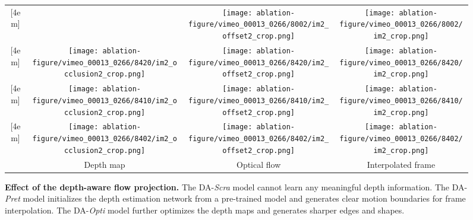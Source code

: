 \documentclass[10pt,twocolumn,letterpaper]{article}
\begin{document}
 	\begin{figure}
	\footnotesize
	\centering
	\renewcommand{\tabcolsep}{1pt} \renewcommand{\arraystretch}{0.7} \begin{tabular}{cccc}
			\parbox[t]{2mm}{[4em]{}} &
&
			\texttt{[image: ablation-figure/vimeo\_00013\_0266/8002/im2\_offset2\_crop.png]}&
			\texttt{[image: ablation-figure/vimeo\_00013\_0266/8002/im2\_crop.png]}
			\\
\parbox[t]{2mm}{[4em]{}} &
			\texttt{[image: ablation-figure/vimeo\_00013\_0266/8420/im2\_occlusion2\_crop.png]}&
			\texttt{[image: ablation-figure/vimeo\_00013\_0266/8420/im2\_offset2\_crop.png]}&
			\texttt{[image: ablation-figure/vimeo\_00013\_0266/8420/im2\_crop.png]}
			\\
			
			\parbox[t]{2mm}{[4em]{}} &
			\texttt{[image: ablation-figure/vimeo\_00013\_0266/8410/im2\_occlusion2\_crop.png]}&
			\texttt{[image: ablation-figure/vimeo\_00013\_0266/8410/im2\_offset2\_crop.png]}&
			\texttt{[image: ablation-figure/vimeo\_00013\_0266/8410/im2\_crop.png]}
			\\
			
			\parbox[t]{2mm}{[4em]{}} &
			\texttt{[image: ablation-figure/vimeo\_00013\_0266/8402/im2\_occlusion2\_crop.png]}&
			\texttt{[image: ablation-figure/vimeo\_00013\_0266/8402/im2\_offset2\_crop.png]}&
			\texttt{[image: ablation-figure/vimeo\_00013\_0266/8402/im2\_crop.png]}
			\\
			\vspace{1mm}
			&
			Depth map&
			Optical flow&
			Interpolated frame \\
		\end{tabular}
	\vspace{-5pt}
	\caption{
		\textbf{Effect of the depth-aware flow projection.} 
The DA-\textit{Scra} model cannot learn any meaningful depth information.
The DA-\textit{Pret} model initializes the depth estimation network from a pre-trained model and generates clear motion boundaries for frame interpolation.
The DA-\textit{Opti} model further optimizes the depth maps and generates sharper edges and shapes.
}
	\label{fig:effect_of_depth_aware} \vspace{-10pt}
\end{figure}
\end{document}
